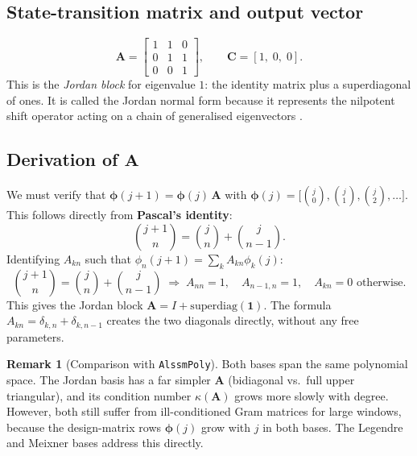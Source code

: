 \documentclass[11pt, a4paper]{article}
\theoremstyle{definition}
\newtheorem{remark}{Remark}
\newcommand{\vC}{\bm{C}}
\newcommand{\mA}{\bm{A}}
\newcommand{\mphi}{\bm{\phi}}
\begin{document}
\subsection{State-transition matrix and output vector}

\begin{equation}
  \mA = \begin{bmatrix}
    1 & 1 & 0 \\
    0 & 1 & 1 \\
    0 & 0 & 1
  \end{bmatrix},
  \qquad
  \vC = [1,\; 0,\; 0].
\end{equation}
This is the \emph{Jordan block} for eigenvalue $1$: the identity matrix
plus a superdiagonal of ones.  It is called the Jordan normal form because
it represents the nilpotent shift operator acting on a chain of generalised
eigenvectors \cite{Horn1985}.

\subsection{Derivation of \texorpdfstring{$\mA$}{A}}

We must verify that $\mphi(j+1) = \mphi(j)\,\mA$ with
$\mphi(j) = \bigl[\binom{j}{0}, \binom{j}{1}, \binom{j}{2}, \ldots\bigr]$.
This follows directly from \textbf{Pascal's identity}:
\begin{equation}
  \binom{j+1}{n} = \binom{j}{n} + \binom{j}{n-1}.
  \label{eq:pascal}
\end{equation}
Identifying $A_{kn}$ such that $\phi_n(j+1) = \sum_k A_{kn}\phi_k(j)$:
\[
  \binom{j+1}{n} = \binom{j}{n} + \binom{j}{n-1}
  \;\Longrightarrow\;
  A_{nn} = 1, \quad A_{n-1,n} = 1, \quad A_{kn} = 0 \text{ otherwise}.
\]
This gives the Jordan block $\mA = I + \mathrm{superdiag}(\mathbf{1})$.
The formula $A_{kn} = \delta_{k,n} + \delta_{k,n-1}$ creates the two
diagonals directly, without any free parameters.

\begin{remark}[Comparison with \texttt{AlssmPoly}]
Both bases span the same polynomial space. The Jordan basis has a far
simpler $\mA$ (bidiagonal vs.\ full upper triangular), and its condition
number $\kappa(\mA)$ grows more slowly with degree. However, both still
suffer from ill-conditioned Gram matrices for large windows, because the
design-matrix rows $\mphi(j)$ grow with $j$ in both bases. The Legendre
and Meixner bases address this directly.
\end{remark}

\end{document}
